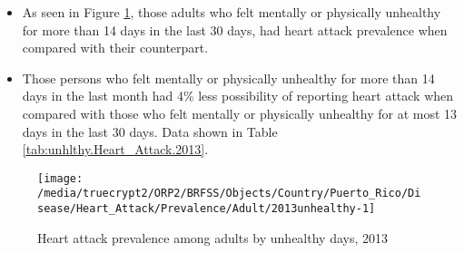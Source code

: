 \newpage
\begin{itemize}

\item As seen in Figure \ref{fig:unhlthy.Heart_Attack.2013}, those adults who felt mentally or physically unhealthy for more than 14 days in the last 30 days, had  
heart attack prevalence when compared with their counterpart.


\item Those persons who felt mentally or physically unhealthy for more than 14 days in the last month had 4\% less possibility of reporting heart attack when compared with those who felt mentally or physically unhealthy for at most 13 days in the last 30 days. Data shown in Table \ref{tab:unhlthy.Heart_Attack.2013}.

\end{itemize}

\begin{figure}[H]
\caption{Heart attack prevalence among adults by unhealthy days, 2013}
\label{fig:unhlthy.Heart_Attack.2013}

\begin{knitrout}
\color{fgcolor}

{\centering \texttt{[image: /media/truecrypt2/ORP2/BRFSS/Objects/Country/Puerto\_Rico/Disease/Heart\_Attack/Prevalence/Adult/2013unhealthy-1]} 

}



\end{knitrout}
\end{figure}

